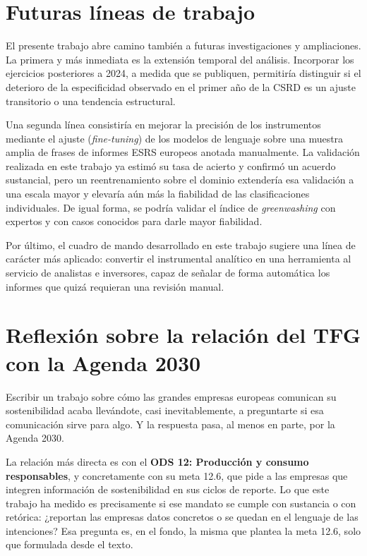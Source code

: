 \section{Futuras líneas de trabajo}
\label{sec:futuras}

El presente trabajo abre camino también a futuras investigaciones y ampliaciones.
La primera y más inmediata es la extensión temporal del análisis. Incorporar los
ejercicios posteriores a 2024, a medida que se publiquen, permitiría distinguir si el deterioro
de la especificidad observado en el primer año de la CSRD es un ajuste transitorio o una tendencia estructural.

Una segunda línea consistiría en mejorar la precisión de los instrumentos mediante el ajuste
(\textit{fine-tuning}) de los modelos de lenguaje sobre una muestra amplia de frases de informes
ESRS europeos anotada manualmente. La validación realizada en este trabajo ya estimó su tasa de acierto y confirmó un acuerdo
sustancial, pero un reentrenamiento sobre el dominio extendería esa validación a una escala mayor y
elevaría aún más la fiabilidad de las clasificaciones individuales. De igual forma, se podría
validar el índice de \textit{greenwashing} con expertos y con casos conocidos para darle mayor
fiabilidad.

Por último, el cuadro de mando
desarrollado en este trabajo sugiere una línea de carácter más aplicado: convertir el
instrumental analítico en una herramienta al servicio de analistas e
inversores, capaz de señalar de forma automática los informes que quizá requieran una revisión manual.

\section{Reflexión sobre la relación del TFG con la Agenda 2030}
\label{sec:agenda2030}

Escribir un trabajo sobre cómo las grandes empresas europeas comunican su sostenibilidad
acaba llevándote, casi inevitablemente, a preguntarte si esa comunicación sirve para algo.
Y la respuesta pasa, al menos en parte, por la Agenda 2030.

La relación más directa es con el \textbf{ODS 12: Producción y consumo responsables},
y concretamente con su meta 12.6, que pide a las empresas que integren información de
sostenibilidad en sus ciclos de reporte. Lo que este trabajo ha medido es precisamente si
ese mandato se cumple con sustancia o con retórica: ¿reportan las empresas datos concretos
o se quedan en el lenguaje de las intenciones? Esa pregunta es, en el fondo, la misma que
plantea la meta 12.6, solo que formulada desde el texto.

